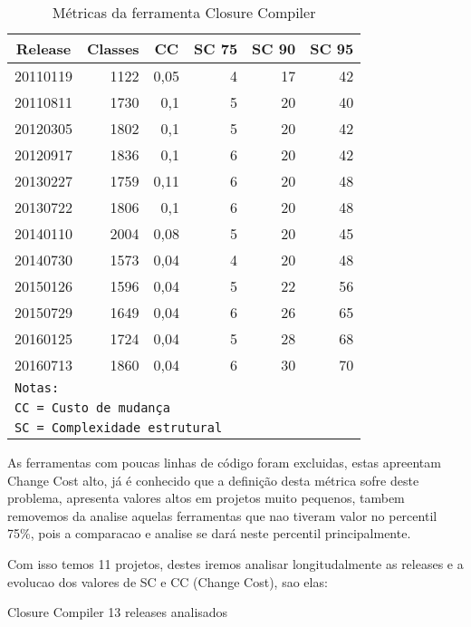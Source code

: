 \begin{table}[H]
\caption{Métricas da ferramenta Closure Compiler}
  \centering
\begin{tabular}{|l|r|r|r|r|r|}
\hline
\multicolumn{1}{|c|}{\textbf{Release}} & \multicolumn{1}{c|}{\textbf{Classes}} & \multicolumn{1}{c|}{\textbf{CC}} & \multicolumn{1}{c|}{\textbf{SC 75}} & \multicolumn{1}{c|}{\textbf{SC 90}} & \multicolumn{1}{c|}{\textbf{SC 95}} \\ \hline
20110119 & 1122 & 0,05 & 4 & 17 & 42 \\ \hline
20110811 & 1730 & 0,1 & 5 & 20 & 40 \\ \hline
20120305 & 1802 & 0,1 & 5 & 20 & 42 \\ \hline
20120917 & 1836 & 0,1 & 6 & 20 & 42 \\ \hline
20130227 & 1759 & 0,11 & 6 & 20 & 48 \\ \hline
20130722 & 1806 & 0,1 & 6 & 20 & 48 \\ \hline
20140110 & 2004 & 0,08 & 5 & 20 & 45 \\ \hline
20140730 & 1573 & 0,04 & 4 & 20 & 48 \\ \hline
20150126 & 1596 & 0,04 & 5 & 22 & 56 \\ \hline
20150729 & 1649 & 0,04 & 6 & 26 & 65 \\ \hline
20160125 & 1724 & 0,04 & 5 & 28 & 68 \\ \hline
20160713 & 1860 & 0,04 & 6 & 30 & 70 \\ \hline
\multicolumn{6}{l}{\texttt{Notas:}} \\
\multicolumn{6}{l}{\texttt{CC = Custo de mudança}} \\
\multicolumn{6}{l}{\texttt{SC = Complexidade estrutural}} \\ \hline
\end{tabular}
\label{metricas-closurecompiler}
\end{table}

As ferramentas com poucas linhas de código foram excluidas, estas
apreentam Change Cost alto, já é conhecido que a definição desta métrica
sofre deste problema, apresenta valores altos em projetos muito pequenos,
tambem removemos da analise aquelas ferramentas que nao tiveram valor
no percentil 75\%, pois a comparacao e analise se dará neste percentil
principalmente.

Com isso temos 11 projetos, destes iremos analisar longitudalmente
as releases e a evolucao dos valores de SC e CC (Change Cost), sao elas:

 Closure Compiler         13 releases analisados

